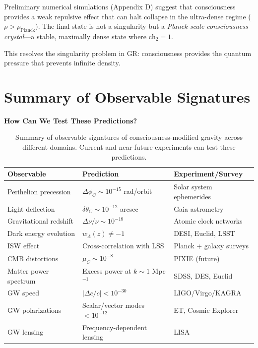 \begin{keyidea}
Preliminary numerical simulations (Appendix D) suggest that consciousness provides a weak repulsive effect that can halt collapse in the ultra-dense regime ($\rho > \rho_{\text{Planck}}$). The final state is not a singularity but a \textit{Planck-scale consciousness crystal}---a stable, maximally dense state where $\text{ch}_2 = 1$.

This resolves the singularity problem in GR: consciousness provides the quantum pressure that prevents infinite density.
\end{keyidea}

\section{Summary of Observable Signatures}

\begin{level2}
\textbf{How Can We Test These Predictions?}

\begin{table}[h]
\centering
\begin{tabular}{@{} l l l @{}}
\toprule
\textbf{Observable} & \textbf{Prediction} & \textbf{Experiment/Survey} \\
\midrule
Perihelion precession & $\Delta \phi_C \sim 10^{-15}$ rad/orbit & Solar system ephemerides \\
Light deflection & $\delta\theta_C \sim 10^{-12}$ arcsec & Gaia astrometry \\
Gravitational redshift & $\Delta\nu/\nu \sim 10^{-18}$ & Atomic clock networks \\
\midrule
Dark energy evolution & $w_\Lambda(z) \neq -1$ & DESI, Euclid, LSST \\
ISW effect & Cross-correlation with LSS & Planck + galaxy surveys \\
CMB distortions & $\mu_C \sim 10^{-8}$ & PIXIE (future) \\
Matter power spectrum & Excess power at $k \sim 1$ Mpc$^{-1}$ & SDSS, DES, Euclid \\
\midrule
GW speed & $|\Delta c/c| < 10^{-30}$ & LIGO/Virgo/KAGRA \\
GW polarizations & Scalar/vector modes $< 10^{-12}$ & ET, Cosmic Explorer \\
GW lensing & Frequency-dependent lensing & LISA \\
\bottomrule
\end{tabular}
\caption{Summary of observable signatures of consciousness-modified gravity across different domains. Current and near-future experiments can test these predictions.}
\label{tab:observables-summary}
\end{table}
\end{level2}

